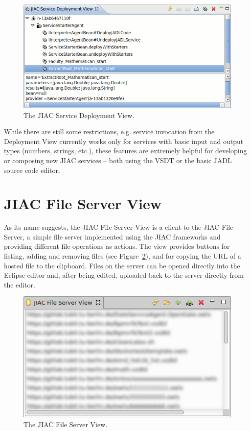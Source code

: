 \begin{figure}[ht]
	\centering
	\includegraphics[width=.5\textwidth]{figures/features/deployment-view.png}
	\caption{The JIAC Service Deployment View.}
	\label{fig:deployView}
\end{figure}

While there are still some restrictions, e.g. service invocation from the
Deployment View currently works only for services with basic input and output
types (numbers, strings, etc.), these features are extremely helpful for developing
or composing new JIAC services -- both using the VSDT or the basic JADL source
code editor.



\section{JIAC File Server View}

As its name suggests, the JIAC File Server View is a client to the JIAC File Server,
a simple file server implemented using the JIAC frameworks and providing different
file operations as actions. The view provides buttons for listing, adding and removing
files (see Figure~\ref{fig:fileserverView}), and for copying the URL of a hosted file
to the clipboard. Files on the server can be opened directly into the Eclipse editor
and, after being edited, uploaded back to the server directly from the editor.

\begin{figure}[ht]
	\centering
	\includegraphics[width=.55\textwidth]{figures/features/fileserverview.png}
	\caption{The JIAC File Server View.}
	\label{fig:fileserverView}
\end{figure}

